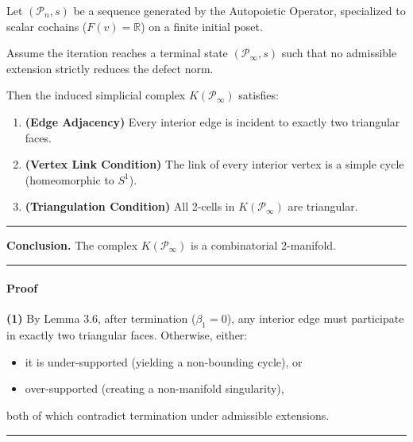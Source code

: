\documentclass[
]{article}
\providecommand{\tightlist}{%
  \setlength{\itemsep}{0pt}\setlength{\parskip}{0pt}}
\begin{document}
Let \((\mathcal{P}_n, s)\) be a sequence generated by the Autopoietic
Operator, specialized to scalar cochains (\(F(v) = \mathbb{R}\)) on a
finite initial poset.

Assume the iteration reaches a terminal state
\((\mathcal{P}_\infty, s)\) such that no admissible extension strictly
reduces the defect norm.

Then the induced simplicial complex \(K(\mathcal{P}_\infty)\) satisfies:

\begin{enumerate}
\def\labelenumi{\arabic{enumi}.}
\item
  \textbf{(Edge Adjacency)} Every interior edge is incident to exactly
  two triangular faces.
\item
  \textbf{(Vertex Link Condition)} The link of every interior vertex is
  a simple cycle (homeomorphic to \(S^1\)).
\item
  \textbf{(Triangulation Condition)} All 2-cells in
  \(K(\mathcal{P}_\infty)\) are triangular.
\end{enumerate}

\begin{center}\rule{0.5\linewidth}{0.5pt}\end{center}

\textbf{Conclusion.} The complex \(K(\mathcal{P}_\infty)\) is a
combinatorial 2-manifold.

\begin{center}\rule{0.5\linewidth}{0.5pt}\end{center}

\paragraph{Proof}\label{proof}

\textbf{(1)} By Lemma 3.6, after termination (\(\beta_1 = 0\)), any
interior edge must participate in exactly two triangular faces.
Otherwise, either:

\begin{itemize}
\tightlist
\item
  it is under-supported (yielding a non-bounding cycle), or
\item
  over-supported (creating a non-manifold singularity),
\end{itemize}

both of which contradict termination under admissible extensions.

\begin{center}\rule{0.5\linewidth}{0.5pt}\end{center}
\end{document}

